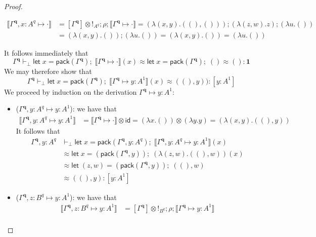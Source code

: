 \documentclass[acmsmall,screen,anonymous,review]{acmart}
\newcommand{\mb}[1]{\ensuremath{\mathbf{#1}}}
\newcommand{\ms}[1]{\ensuremath{\mathsf{#1}}}
\newcommand{\letexpr}[3]{\ensuremath{\ms{let}\;#1 = #2;\;#3}}
\newcommand{\cwk}[2]{#1 \mapsto #2}
\newcommand{\dnt}[1]{\llbracket{#1}\rrbracket}
\newcommand{\tmor}[1]{{!}_{#1}}
\begin{document}
\begin{proof}
\begin{itemize}
    \begin{align*}
      \dnt{\cwk{\Gamma^{\mb{q}}, x : A^q}{\cdot}}
      &= [\Gamma^{\mb{q}}] \otimes \tmor{A^q} ; \rho ; \dnt{\cwk{\Gamma^{\mb{q}}}{\cdot}} 
       = (\lambda (x, y) . ((), ())) ; (\lambda (z, w) . z) ; (\lambda u . ()) \\
      &= (\lambda (x, y) . ()) ; (\lambda u . ()) = (\lambda (x, y) . ()) = (\lambda u . ())
    \end{align*}
  \end{itemize}
  It follows immediately that
  \begin{equation*}
  \Gamma^{\mb{q}} \vdash_\bot 
    \letexpr{x}{\ms{pack}(\Gamma^{\mb{q}})}{\dnt{\cwk{\Gamma^{\mb{q}}}{\cdot}}(x)}
    \approx \letexpr{x}{\ms{pack}(\Gamma^{\mb{q}})}{()}
    \approx ()
    : \mb{1}
  \end{equation*}
  We may therefore show that
  \begin{equation*}
  \Gamma^{\mb{q}} \vdash_\bot 
    \letexpr{x}{\ms{pack}(\Gamma^{\mb{q}})}{\dnt{\cwk{\Gamma^{\mb{q}}}{y : A^1}}(x)}
    \approx ((), y))
    : [y : A^1]
  \end{equation*}
  We proceed by induction on the derivation $\cwk{\Gamma^{\mb{q}}}{y : A^1}$:
  \begin{itemize}
    \item ($\cwk{\Gamma^{\mb{q}}, y : A^q}{y : A^1}$): we have that
    \begin{align*}
    \dnt{\cwk{\Gamma^{\mb{q}}, y : A^q}{y : A^1}}
    &= \dnt{\cwk{\Gamma^{\mb{q}}}{\cdot}} \otimes \ms{id}
     = (\lambda x.()) \otimes (\lambda y.y)
     = (\lambda (x, y) . ((), y))
    \end{align*}
    It follows that
    \begin{align*}
    \Gamma^{\mb{q}}, y : A^q & \vdash_\bot
      \letexpr{x}{\ms{pack}(\Gamma^{\mb{q}}, y : A^q)}  
        {\dnt{\cwk{\Gamma^{\mb{q}}, y : A^q}{y : A^1}}(x)} \\
      &\approx \letexpr{x}{(\ms{pack}(\Gamma^{\mb{q}}, y))}{(\lambda (z, w) . ((), w))(x)} \\
      &\approx \letexpr{(z, w)}{(\ms{pack}(\Gamma^{\mb{q}}, y))}{((), w)} \\
      &\approx ((), y)
      : [y : A^1]
    \end{align*}
    \item ($\cwk{\Gamma^{\mb{q}}, z : B^q}{y : A^1}$): we have that
    \begin{align*}
    \dnt{\cwk{\Gamma^{\mb{q}}, z : B^q}{y : A^1}}
    &= [\Gamma^{\mb{q}}] \otimes \tmor{B^q} ; \rho ; \dnt{\cwk{\Gamma^{\mb{q}}}{y : A^1}} \\

\end{align*}
\end{itemize}
\end{proof}
\end{document}
